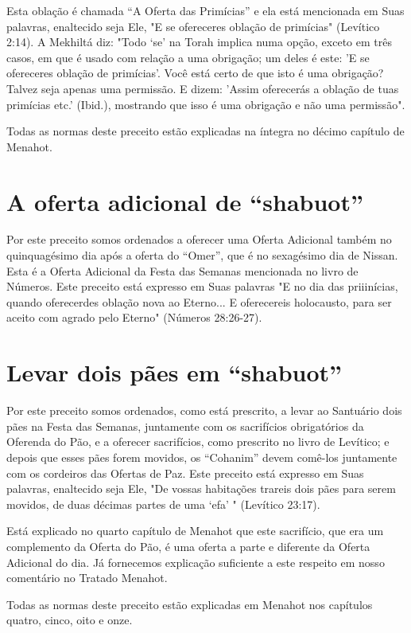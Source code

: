 Esta oblação é chamada ``A Oferta das Primícias'' e ela está mencio­nada
em Suas palavras, enaltecido seja Ele, "E se ofereceres oblação de
primí­cias" (Levítico 2:14). A Mekhiltá diz: "Todo `se' na Torah implica
numa opção, exceto em três casos, em que é usado com relação a uma
obrigação; um deles é este: 'E se ofereceres oblação de primícias'. Você
está certo de que isto é uma obrigação? Talvez seja apenas uma
permissão. E dizem: 'Assim oferecerás a obla­ção de tuas primícias etc.'
(Ibid.), mostrando que isso é uma obrigação e não uma permissão".

Todas as normas deste preceito estão explicadas na íntegra no déci­mo
capítulo de Menahot.

\section{A oferta adicional de ``shabuot''}

Por este preceito somos ordenados a oferecer uma Oferta Adicional também
no quinquagésimo dia após a oferta do ``Omer'', que é no sexagésimo dia de
Nissan. Esta é a Oferta Adicional da Festa das Semanas mencionada no
livro de Números. Este preceito está expresso em Suas palavras "E no dia
das priiinícias, quando oferecerdes oblação nova ao Eterno... E
oferecereis holocaus­to, para ser aceito com agrado pelo Eterno"
(Números 28:26-27).

\section{Levar dois pães em ``shabuot''}

Por este preceito somos ordenados, como está prescrito, a levar ao
Santuário dois pães na Festa das Semanas, juntamente com os sacrifícios
obri­gatórios da Oferenda do Pão, e a oferecer sacrifícios, como
prescrito no livro de Levítico; e depois que esses pães forem movidos,
os ``Cohanim'' devem comê-los juntamente com os cordeiros das Ofertas de
Paz. Este preceito está expres­so em Suas palavras, enaltecido seja Ele,
"De vossas habitações trareis dois pães para serem movidos, de duas
décimas partes de uma `efa' " (Levítico 23:17).

Está explicado no quarto capítulo de Menahot que este sacrifício, que
era um complemento da Oferta do Pão, é uma oferta a parte e diferente da
Oferta Adicional do dia. Já fornecemos explicação suficiente a este
respeito em nosso comentário no Tratado Menahot.

Todas as normas deste preceito estão explicadas em Menahot nos capítulos
quatro, cinco, oito e onze.

